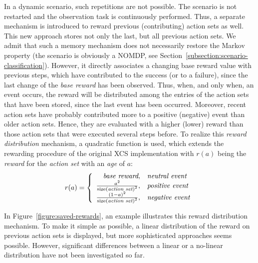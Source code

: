 In a dynamic scenario, such repetitions are not possible. The scenario is not restarted and the observation task is continuously performed. Thus, a separate mechanism is introduced to reward previous (contributing) action sets as well. This new approach stores not only the last, but all previous action sets. We admit that such a memory mechanism does not necessarily restore the Markov property (the scenario is obviously a NOMDP, see Section~\ref{subsection:scenario-classification}). However, it directly associates a changing base reward value with previous steps, which have contributed to the success (or to a failure), since the last change of the \emph{base reward} has been observed. %
Thus, when, and only when, an event occurs, the reward will be distributed among the entries of the action sets that have been stored, since the last event has been occurred. Moreover, recent action sets have probably contributed more to a positive (negative) event than older action sets. Hence, they are evaluated with a higher (lower) reward than those action sets that were executed several steps before. To realize this \emph{reward distribution} mechanism, a quadratic function is used, which extends the rewarding procedure of the original XCS implementation with $r(a)$ being the \emph{reward} for the \emph{action set} with an \emph{age} of $a$:
$$ %
	r(a) = 
	\left\{ \begin{array}{r@{,\quad}l}
		\emph{base reward} & \mbox{\emph{neutral event}}\\  	
		\frac{{a}^{2}}{{\mathrm{size(\emph{action set})}}^{2}} & \mbox{\emph{positive event}} \\
  		\frac{{(1 - a)}^{2}}{{\mathrm{size(\emph{action set})}}^{2}} & \mbox{\emph{negative event}}
  	\end{array} \right.
$$ %

In Figure~\ref{figure:saved-rewards}, an example illustrates this reward distribution mechanism. To make it simple as possible, a linear distribution of the reward on previous action sets is displayed, but more sophisticated approaches seems possible. However, significant differences between a linear or a no-linear distribution have not been investigated so far. 

